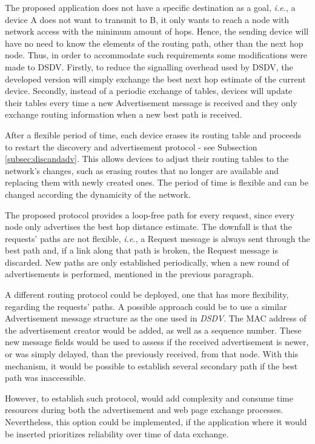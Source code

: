 The proposed application does not have a specific destination as a goal, \textit{i.e.}, a device A does not want to transmit to B, it only wants to reach a node with network access with the minimum amount of hops. Hence, the sending device will have no need to know the elements of the routing path, other than the next hop node. Thus, in order to accommodate such requirements some modifications were made to \gls{DSDV}. Firstly, to reduce the signalling overhead used by \gls{DSDV}, the developed version will simply exchange the best next hop estimate of the current device. Secondly, instead of a periodic exchange of tables, devices will update their tables every time a new Advertisement message is received and they only exchange routing information when a new best path is received.

After a flexible period of time, each device erases its routing table and proceeds to restart the discovery and advertisement protocol - see Subsection \ref{subsec:discandadv}. This allows devices to adjust their routing tables to the network's changes, such as erasing routes that no longer are available and replacing them with newly created ones. The period of time is flexible and can be changed according the dynamicity of the network.

The proposed protocol provides a loop-free path for every request, since every node only advertises the best hop distance estimate. The downfall is that the requests' paths are not flexible, \textit{i.e.}, a Request message is always sent through the best path and, if a link along that path is broken, the Request message is discarded. New paths are only established periodically, when a new round of advertisements is performed, mentioned in the previous paragraph.

A different routing protocol could be deployed, one that has more flexibility, regarding the requests' paths. A possible approach could be to use a similar Advertisement message structure as the one used in \textit{DSDV}. The \gls{MAC} address of the advertisement creator would be added, as well as a sequence number. These new message fields would be used to assess if the received advertisement is newer, or was simply delayed, than the previously received, from that node. With this mechanism, it would be possible to establish several secondary path if the best path was inaccessible.

However, to establish such protocol, would add complexity and consume time resources during both the advertisement and web page exchange processes. Nevertheless, this option could be implemented, if the application where it would be inserted prioritizes reliability over time of data exchange.

